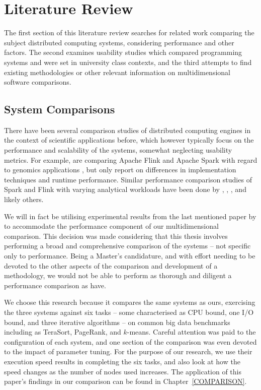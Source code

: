\chapter{Literature Review}
\label{LITERATURE_REVIEW}

  The first section of this literature review searches for related work comparing the subject distributed computing systems, considering performance and other factors. The second examines usability studies which compared programming systems and were set in university class contexts, and the third attempts to find existing methodologies or other relevant information on multidimensional software comparisons.


\section{System Comparisons}
\label{SYSTEM_COMPARISONS}

  There have been several comparison studies of distributed computing engines in the context of scientific applications before, which however typically focus on the performance and scalability of the systems, somewhat neglecting usability metrics. For example, \citeauthor{BERTONI:EVAL_CLOUD_FRAMEWORKS:2015} are comparing Apache Flink and Apache Spark with regard to genomics applications \cite{BERTONI:EVAL_CLOUD_FRAMEWORKS:2015}, but only report on differences in implementation techniques and runtime performance. Similar performance comparison studies of Spark and Flink with varying analytical workloads have been done by \citeauthor{MARCU:SPARK_VS_FLINK:2016} \cite{MARCU:SPARK_VS_FLINK:2016}, \citeauthor{PereraPH:CORR2016} \cite{PereraPH:CORR2016}, \citeauthor{VEIGA:EVALUATION:2015} \cite{VEIGA:EVALUATION:2015}, and likely others.
  
  We will in fact be utilising experimental results from the last mentioned paper by \citeauthor{VEIGA:EVALUATION:2015} \cite{VEIGA:EVALUATION:2015} to accommodate the performance component of our multidimensional comparison. This decision was made considering that this thesis involves performing a broad and comprehensive comparison of the systems -- not specific only to performance. Being a Master's candidature, and with effort needing to be devoted to the other aspects of the comparison and development of a methodology, we would not be able to perform as thorough and diligent a performance comparison as \citeauthor{VEIGA:EVALUATION:2015} have.
  
  We choose this research because it compares the same systems as ours, exercising the three systems against six tasks -- some characterised as CPU bound, one I/O bound, and three iterative algorithms -- on common big data benchmarks including as TeraSort, PageRank, and $k$-means. Careful attention was paid to the configuration of each system, and one section of the comparison was even devoted to the impact of parameter tuning. For the purpose of our research, we use their execution speed results in completing the six tasks, and also look at how the speed changes as the number of nodes used increases. The application of this paper's findings in our comparison can be found in Chapter~\ref{COMPARISON}.

